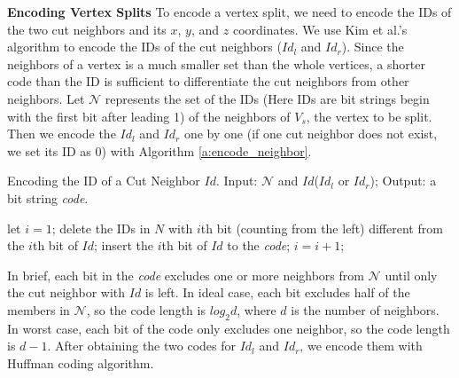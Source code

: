     \textbf{Encoding Vertex Splits}
	To encode a vertex split, we need to encode the IDs of the two
	cut neighbors and its $x$, $y$, and $z$ coordinates.
    We use Kim et al.'s algorithm \cite{multiresolution:kim}
    to encode the IDs of the cut neighbors ($Id_l$ and $Id_r$). 
    Since the neighbors of a vertex is a much smaller set 
    than the whole vertices, a shorter code than the ID is sufficient
    to differentiate the cut neighbors from other neighbors. 
    Let $\mathcal{N}$ represents the set of the IDs 
    (Here IDs are bit strings begin with the first bit after leading 1)
    of the neighbors of $V_s$, the vertex to be split. 
    Then we encode the $Id_l$ and $Id_r$ one by one 
    (if one cut neighbor does not exist, we set its ID as $0$)
    with Algorithm \ref{a:encode_neighbor}.
    \begin{algorithm}
    \caption{Encoding the ID of a Cut Neighbor $Id$. 
    Input: $\mathcal{N}$ and $Id$($Id_l$ or $Id_r$); Output: a bit string \emph{code}.
    \label{a:encode_neighbor}}
    \begin{algorithmic}
    \STATE let $i = 1$;
        \STATE delete the IDs in $N$ with $i$th bit (counting from the left) different from the $i$th bit of $Id$;
            \STATE insert the $i$th bit of $Id$ to the \emph{code};
        \ENDIF
        \STATE $i=i+1$;
    \ENDWHILE
    \end{algorithmic}
    \end{algorithm}
    In brief, each bit in the \emph{code} excludes one or more neighbors
    from $\mathcal{N}$ until only the cut neighbor with $Id$ is left. 
    In ideal case, each bit excludes half of the members
    in $\mathcal{N}$, so the code length is $log_{2}d$, 
    where $d$ is the number of neighbors.
    In worst case, each bit of the code only excludes one neighbor,
    so the code length is $d-1$. 
    After obtaining the two codes for $Id_l$ and $Id_r$, we encode them with Huffman coding algorithm.

